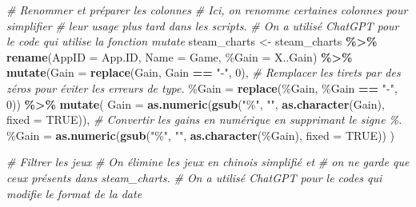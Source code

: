 \documentclass[mstat,12pt]{unswthesis}
\newenvironment{Shaded}{\begin{snugshade}}{\end{snugshade}}
\newcommand{\AttributeTok}[1]{\textcolor[rgb]{0.13,0.29,0.53}{#1}}
\newcommand{\CommentTok}[1]{\textcolor[rgb]{0.56,0.35,0.01}{\textit{#1}}}
\newcommand{\ConstantTok}[1]{\textcolor[rgb]{0.56,0.35,0.01}{#1}}
\newcommand{\DecValTok}[1]{\textcolor[rgb]{0.00,0.00,0.81}{#1}}
\newcommand{\FunctionTok}[1]{\textcolor[rgb]{0.13,0.29,0.53}{\textbf{#1}}}
\newcommand{\NormalTok}[1]{#1}
\newcommand{\OtherTok}[1]{\textcolor[rgb]{0.56,0.35,0.01}{#1}}
\newcommand{\SpecialCharTok}[1]{\textcolor[rgb]{0.81,0.36,0.00}{\textbf{#1}}}
\newcommand{\StringTok}[1]{\textcolor[rgb]{0.31,0.60,0.02}{#1}}
\begin{document}
\begin{Shaded}
\begin{Highlighting}[]
\CommentTok{\# Renommer et préparer les colonnes}
\CommentTok{\# Ici, on renomme certaines colonnes pour simplifier}
\CommentTok{\# leur usage plus tard dans les scripts.}
\CommentTok{\# On a utilisé ChatGPT pour le code qui utilise la fonction mutate}
\NormalTok{steam\_charts }\OtherTok{\textless{}{-}}\NormalTok{ steam\_charts }\SpecialCharTok{\%\textgreater{}\%}
  \FunctionTok{rename}\NormalTok{(}\AttributeTok{AppID =}\NormalTok{ App.ID, }\AttributeTok{Name =}\NormalTok{ Game, }\StringTok{\textasciigrave{}}\AttributeTok{\%Gain}\StringTok{\textasciigrave{}} \OtherTok{=}\NormalTok{ X..Gain) }\SpecialCharTok{\%\textgreater{}\%}
  \FunctionTok{mutate}\NormalTok{(}\AttributeTok{Gain =} \FunctionTok{replace}\NormalTok{(Gain, Gain }\SpecialCharTok{==} \StringTok{"{-}"}\NormalTok{, }\DecValTok{0}\NormalTok{), }
         \CommentTok{\# Remplacer les tirets par des zéros pour éviter les erreurs de type.}
         \StringTok{\textasciigrave{}}\AttributeTok{\%Gain}\StringTok{\textasciigrave{}} \OtherTok{=} \FunctionTok{replace}\NormalTok{(}\StringTok{\textasciigrave{}}\AttributeTok{\%Gain}\StringTok{\textasciigrave{}}\NormalTok{, }\StringTok{\textasciigrave{}}\AttributeTok{\%Gain}\StringTok{\textasciigrave{}} \SpecialCharTok{==} \StringTok{"{-}"}\NormalTok{, }\DecValTok{0}\NormalTok{)) }\SpecialCharTok{\%\textgreater{}\%}
  \FunctionTok{mutate}\NormalTok{(}
    \AttributeTok{Gain =} \FunctionTok{as.numeric}\NormalTok{(}\FunctionTok{gsub}\NormalTok{(}\StringTok{"\%"}\NormalTok{, }\StringTok{""}\NormalTok{, }\FunctionTok{as.character}\NormalTok{(Gain), }\AttributeTok{fixed =} \ConstantTok{TRUE}\NormalTok{)),  }
    \CommentTok{\# Convertir les gains en numérique en supprimant le signe \%.}
    \StringTok{\textasciigrave{}}\AttributeTok{\%Gain}\StringTok{\textasciigrave{}} \OtherTok{=} \FunctionTok{as.numeric}\NormalTok{(}\FunctionTok{gsub}\NormalTok{(}\StringTok{"\%"}\NormalTok{, }\StringTok{""}\NormalTok{, }\FunctionTok{as.character}\NormalTok{(}\StringTok{\textasciigrave{}}\AttributeTok{\%Gain}\StringTok{\textasciigrave{}}\NormalTok{), }\AttributeTok{fixed =} \ConstantTok{TRUE}\NormalTok{))}
\NormalTok{  )}

\CommentTok{\# Filtrer les jeux}
\CommentTok{\# On élimine les jeux en chinois simplifié et }
\CommentTok{\# on ne garde que ceux présents dans steam\_charts.}
\CommentTok{\# On a utilisé ChatGPT pour le codes qui modifie le format de la date}


\end{Highlighting}
\end{Shaded}
\end{document}
